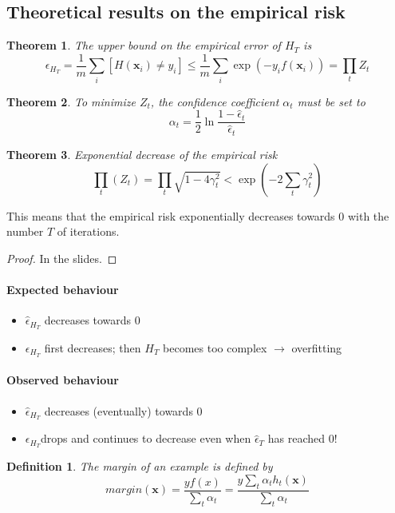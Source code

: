\documentclass{article}
\newtheorem{thm}{Theorem}
\newtheorem{defi}{Definition}
\begin{document}


\subsection{Theoretical results on the empirical risk}
\begin{thm}
The upper bound on the empirical error of $H_T$ is 
\[\epsilon_{H_T}=\dfrac{1}{m}\sum_{i}[H(\mathbf{x}_i)\neq y_i] \leq \dfrac{1}{m}\sum_{i}\exp(-y_if(\mathbf{x}_i))=\prod_t Z_t\]
\end{thm}

\begin{thm}
To minimize $Z_t$, the confidence coefficient $\alpha_t$ must be set to
\[\alpha_t= \dfrac{1}{2} \ln \dfrac{1-\hat{\epsilon}_t}{\hat{\epsilon}_t}\]
\end{thm}

\begin{thm}
Exponential decrease of the empirical risk
\[\prod_t (Z_t)=\prod_t \sqrt{1-4\gamma_t^2}<\exp(-2\sum_t\gamma_t^2)\]
\end{thm}
This means that the empirical risk exponentially decreases towards 0 with the number $T$ of iterations.

\begin{proof}
In the slides.
\end{proof}

\paragraph{Expected behaviour}
\begin{itemize}[noitemsep]
\item $\hat{\epsilon}_{H_T}$ decreases towards 0
\item $\epsilon_{H_T}$ first decreases; then $H_T$ becomes too complex $\to$ overfitting
\end{itemize}

\paragraph{Observed behaviour}
\begin{itemize}[noitemsep]
\item $\hat{\epsilon}_{H_T}$ decreases (eventually) towards 0
\item $\epsilon_{H_T}$drops and continues to decrease even when $\hat{\epsilon}_T$ has reached 0!
\end{itemize}


\begin{defi}
The margin of an example is defined by
\[margin(\mathbf{x})=\dfrac{yf(x)}{\sum_{t}\alpha_t}=\dfrac{y\sum_{t}\alpha_t h_t(\mathbf{x})}{\sum_t \alpha_t}\]
\end{defi}
\end{document}
